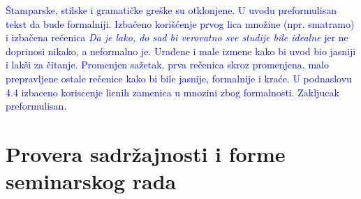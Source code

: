 \documentclass[a4paper]{report}
\newcommand{\odgovor}[1]{\textcolor{blue}{#1}}
\begin{document}
 
 \odgovor{Štamparske, stilske  i gramatičke greške su otklonjene.}
 \odgovor{U uvodu preformulisan tekst da bude formalniji. Izbačeno korišćenje prvog lica množine (npr. smatramo) i izbačena rečenica \emph{Da je lako, do sad bi verovatno sve studije bile idealne} jer ne doprinosi nikako, a neformalno je. Urađene i male izmene kako bi uvod bio jasniji i lakši za čitanje. Promenjen sažetak, prva rečenica skroz promenjena, malo prepravljene ostale rečenice kako bi bile jasnije, formalnije i kraće. U podnaslovu 4.4 izbaceno koriscenje licnih zamenica u mnozini zbog formalnosti. Zakljucak preformulisan. }
 
 \section{Provera sadržajnosti i forme seminarskog rada}
 
\end{document}
